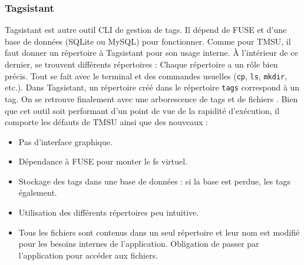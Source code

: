 \documentclass[a4paper, 12pt]{article}
\begin{document}
\subsubsection{Tagsistant}
Tagsistant \cite{ref16} est autre outil CLI de gestion de tags. Il dépend de FUSE et d'une base 
de données (SQLite ou MySQL) pour fonctionner. Comme pour TMSU, il faut donner un répertoire à Tagsistant 
pour son usage interne. À l'intérieur de ce dernier, se trouvent différents répertoires :
\bigbreak
Chaque répertoire a un rôle bien précis. Tout se fait avec le terminal et des commandes usuelles 
(\texttt{cp}, \texttt{ls}, \texttt{mkdir}, etc.). Dans Tagsistant, 
un répertoire créé dans le répertoire \texttt{tags} correspond à un tag. On se retrouve 
finalement avec une arborescence de tags et de fichiers \cite{ref17}. Bien que cet outil soit 
performant d'un point de vue de la rapidité d'exécution, il comporte les défauts de TMSU ainsi que 
des nouveaux :
\begin{itemize}
    \item Pas d'interface graphique.
    \item Dépendance à FUSE pour monter le \acrshort{fs} virtuel.
    \item Stockage des tags dans une base de données : si la base est perdue, les tags également.
    \item Utilisation des différents répertoires peu intuitive.
    \item Tous les fichiers sont contenus dans un seul répertoire et leur nom est modifié pour les 
        besoins internes de l'application. Obligation de passer par l'application pour accéder aux 
        fichiers.
\end{itemize} 
\end{document}

